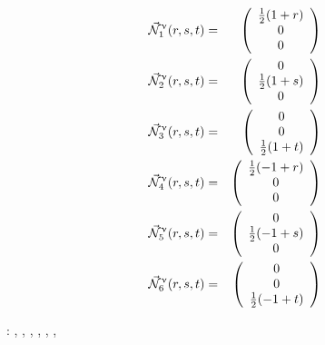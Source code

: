 \begin{mdframed}[backgroundcolor=blue!5]
\begin{eqnarray}
\vec{{\mathcal{N}}}^\upnu_1 (r,s,t) &=& 
\left(\begin{array}{c} \frac12 (1+r) \\ 0 \\ 0\end{array}\right) \nonumber\\
\vec{{\mathcal{N}}}^\upnu_2 (r,s,t) &=& 
\left(\begin{array}{c} 0 \\ \frac12 (1+s) \\0 \end{array}\right) \nonumber\\
\vec{{\mathcal{N}}}^\upnu_3 (r,s,t) &=& 
\left(\begin{array}{c} 0 \\  0 \\\frac12 (1+t)  \end{array}\right) \nonumber\\
\vec{{\mathcal{N}}}^\upnu_4 (r,s,t) &=& 
\left(\begin{array}{c} \frac12 (-1+r) \\ 0 \\ 0 \end{array}\right) \nonumber\\
\vec{{\mathcal{N}}}^\upnu_5 (r,s,t) &=& 
\left(\begin{array}{c} 0 \\ \frac12 (-1+s)  \\ 0 \end{array}\right) \nonumber\\
\vec{{\mathcal{N}}}^\upnu_6 (r,s,t) &=& 
\left(\begin{array}{c} 0 \\ 0 \\\frac12 (-1+t)  \end{array}\right)
\end{eqnarray}
\end{mdframed}



\vspace{1cm}

\Literature: ,
 , , 
 , , ,
